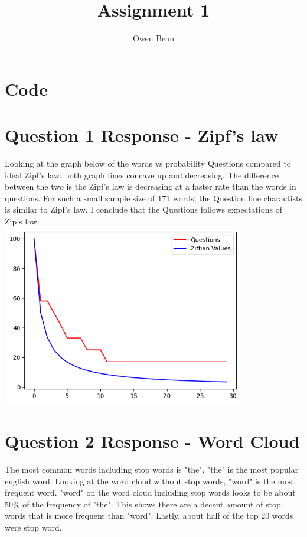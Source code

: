 \documentclass{article}
\title{Assignment 1}
\author{Owen Bean}
\begin{document}
\maketitle

\section{Code}

\section{Question 1 Response - Zipf's law}

Looking at the graph below of the words vs probability Questions compared to ideal Zipf's law, both graph lines concave up and decreasing. The difference between the two is the Zipf's law is decreasing at a faster rate than the words in questions. For such a small sample size of 171 words, the Question line charactists is similar to Zipf's law. I conclude that the Questions follows expectations of Zip's law.
\\

\includegraphics[width=400]{images/zipf.png}

\section{Question 2 Response - Word Cloud}

The most common words including stop words is "the". "the" is the most popular english word. Looking at the word cloud without stop words, "word" is the most frequent word. "word" on the word cloud including stop words looks to be about 50\% of the frequency of "the". This shows there are a decent amount of stop words that is more frequent than "word". Lastly, about half of the top 20 words were stop word. \\ \\
\end{document}
